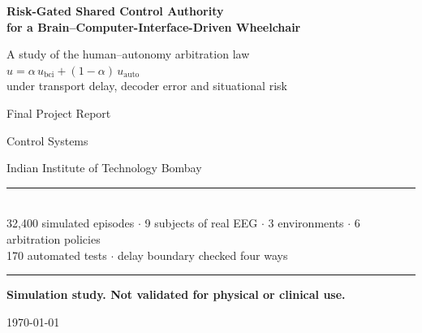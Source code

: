 \documentclass[11pt,a4paper]{article}
\newcommand{\ubci}{u_{\mathrm{bci}}}
\newcommand{\uauto}{u_{\mathrm{auto}}}
\theoremstyle{plain}
\theoremstyle{definition}
\begin{document}

\hypersetup{pageanchor=false}
\begin{titlepage}
\centering
\vspace*{2.5cm}

{\LARGE\bfseries Risk-Gated Shared Control Authority\\[0.35em]
for a Brain--Computer-Interface-Driven Wheelchair\par}

\vspace{0.8cm}
{\large A study of the human--autonomy arbitration law\\
$u = \alpha\,\ubci + (1-\alpha)\,\uauto$\\
under transport delay, decoder error and situational risk\par}

\vspace{2.0cm}
{\large Final Project Report\par}
\vspace{0.4cm}
{\large Control Systems\par}
\vspace{0.3cm}
{\large Indian Institute of Technology Bombay\par}

\vspace{2.5cm}
\begin{minipage}{0.8\textwidth}
\centering
\rule{\textwidth}{0.4pt}\\[0.6em]
{\small
32{,}400 simulated episodes $\cdot$ 9 subjects of real EEG $\cdot$
3 environments $\cdot$ 6 arbitration policies\\
170 automated tests $\cdot$ delay boundary checked four ways
}\\[0.6em]
\rule{\textwidth}{0.4pt}
\end{minipage}

\vspace{1.0cm}
\begin{minipage}{0.8\textwidth}
\centering
{\small\bfseries Simulation study. Not validated for physical or
clinical use.}
\end{minipage}

\vfill
{\large \today\par}
\end{titlepage}
\hypersetup{pageanchor=true}
\end{document}
